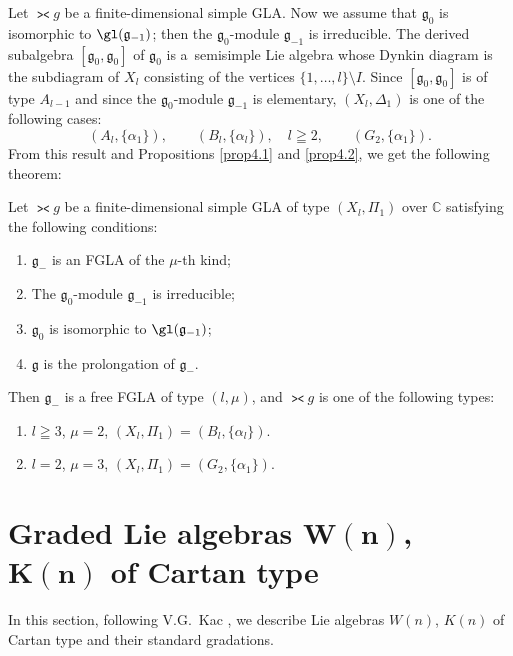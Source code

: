 Let $\gla g$ be a f\/inite-dimensional simple GLA.
Now we assume that $\mathfrak g_0$ is isomorphic to $\gl(\mathfrak g_{-1})$;
then the $\mathfrak g_0$-module $\mathfrak g_{-1}$ is irreducible.
The derived subalgebra $[\mathfrak g_0,\mathfrak g_0]$ of $\mathfrak g_0$
is a~semisimple Lie algebra whose Dynkin diagram is the subdiagram of
$X_l$ consisting
of the vertices $\{1,\dots,l\}\setminus I$.
Since $[\mathfrak g_0,\mathfrak g_0]$ is of type $A_{l-1}$ and since
the $\mathfrak g_0$-module $\mathfrak g_{-1}$ is elementary,
$(X_l,\Delta_1)$ is one of the following cases:
\[
(A_l,\{\alpha_1\}),\qquad (B_l,\{\alpha_l\}), \quad  l\geqq2,
\qquad (G_2,\{\alpha_1\}).
\]
From this result and Propositions \ref{prop4.1} and \ref{prop4.2}, we get the following theorem:
\begin{theorem}\label{thm5.2}
Let $\gla g$ be a finite-dimensional simple GLA of type
$(X_l,\Pi_1)$ over $\mathbb C$ satisfying the following conditions:
\begin{enumerate}\itemsep=0pt
\renewcommand{\labelenumi}{$(\roman{enumi})$}
\item $\mathfrak g_-$ is an FGLA of the $\mu$-th kind;
\item The $\mathfrak g_0$-module $\mathfrak g_{-1}$ is irreducible;
\item $\mathfrak g_0$ is isomorphic to $\gl(\mathfrak g_{-1})$;
\item $\mathfrak g$ is the prolongation of $\mathfrak g_{-}$.
\end{enumerate}

Then $\mathfrak g_-$ is a free FGLA of type
$(l,\mu)$, and
$\gla g$ is one of the following types:
\begin{enumerate}\itemsep=0pt
\renewcommand{\labelenumi}{$(\alph{enumi})$}
\item $l\geqq3$, $\mu=2$, $(X_l,\Pi_1)=(B_l,\{\alpha_l\})$.
\item $l=2$, $\mu=3$, $(X_l,\Pi_1)=(G_2,\{\alpha_1\})$.
\end{enumerate}
\end{theorem}

\section[Graded Lie algebras $W(n)$, $K(n)$ of Cartan type]{Graded Lie algebras $\boldsymbol{W(n)}$, $\boldsymbol{K(n)}$ of Cartan type}\label{section6}

In this section, following V.G.~Kac \cite{kac68:1},
we describe Lie algebras $W(n)$, $K(n)$ of Cartan type and their standard gradations.

